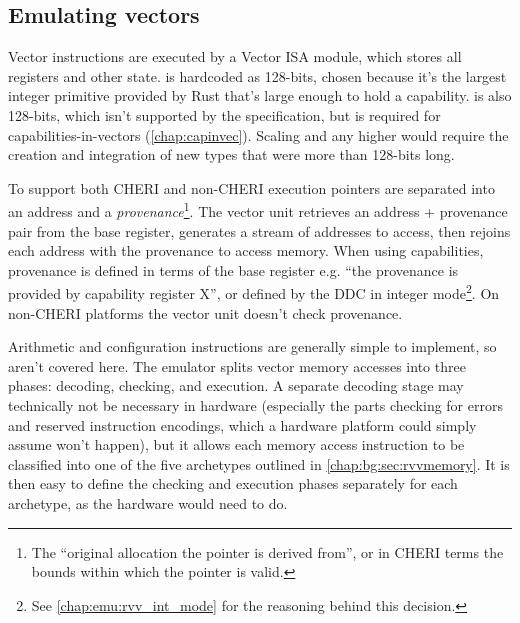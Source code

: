 \subsection{Emulating vectors}

Vector instructions are executed by a Vector ISA module, which stores all registers and other state.
 is hardcoded as 128-bits, chosen because it's the largest integer primitive provided by Rust that's large enough to hold a capability.
 is also 128-bits, which isn't supported by the specification, but is required for capabilities-in-vectors (\cref{chap:capinvec}).
Scaling  and  any higher would require the creation and integration of new types that were more than 128-bits long.

To support both CHERI and non-CHERI execution pointers are separated into an address and a \emph{provenance}\footnote{The ``original allocation the pointer is derived from''\cite{memarianExploringSemanticsPointer2019}, or in CHERI terms the bounds within which the pointer is valid.}.
The vector unit retrieves an address + provenance pair from the base register, generates a stream of addresses to access, then rejoins each address with the provenance to access memory.
When using capabilities, provenance is defined in terms of the base register e.g. \enquote{the provenance is provided by capability register X}, or defined by the DDC in integer mode\footnote{See \cref{chap:emu:rvv_int_mode} for the reasoning behind this decision.}.
On non-CHERI platforms the vector unit doesn't check provenance.

Arithmetic and configuration instructions are generally simple to implement, so aren't covered here.
The emulator splits vector memory accesses into three phases: decoding, checking, and execution.
A separate decoding stage may technically not be necessary in hardware (especially the parts checking for errors and reserved instruction encodings, which a hardware platform could simply assume won't happen), but it allows each memory access instruction to be classified into one of the five archetypes outlined in \cref{chap:bg:sec:rvvmemory}.
It is then easy to define the checking and execution phases separately for each archetype, as the hardware would need to do.

